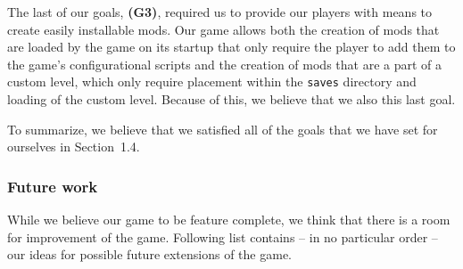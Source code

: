 The last of our goals, \textbf{(G3)}, required us to provide our players with means to create easily installable mods. Our game allows
both the creation of mods that are loaded by the game on its startup that only require the player to add them to the game's
configurational scripts and the creation of mods that are a part of a custom level, which only require placement within the
\texttt{saves} directory and loading of the custom level. Because of this, we believe that we also this last goal.

To summarize, we believe that we satisfied all of the goals that we have set for ourselves in Section~1.4.

\subsubsection{Future work}

While we believe our game to be feature complete, we think that there is a room for improvement of the game.
Following list contains -- in no particular order -- our ideas for possible future extensions of the game.

